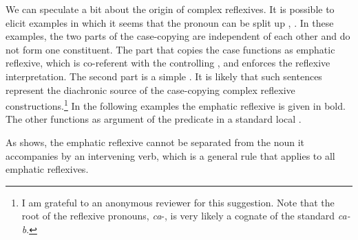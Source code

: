 \begin{exe} 
\end{exe}

We can speculate a bit about the origin of complex reflexives. It is possible to elicit examples in which it seems that the pronoun can be split up , . In these examples, the two parts of the case-copying  are independent of each other and do not form one constituent. The part that copies the case functions as emphatic reflexive, which is co-referent with the controlling , and enforces the reflexive interpretation. The second part is a simple . It is likely that such sentences represent the diachronic source of the case-copying complex reflexive constructions.\footnote{I am grateful to an anonymous reviewer for this suggestion. Note that the root of the  reflexive pronouns, \textit{ca}-, is very likely a cognate of the standard  \textit{ca-b}.} In the following examples  the emphatic reflexive is given in bold. The other  functions as  argument of the predicate  in a standard local .

\begin{exe}
	\ex	\label{ex:Rashid will you please stop staring at the mirror}
	\begin{xlist}
		\ex	{}		\label{ex:Rashid will you please stop staring at the mirror@A}

		\ex	{}		\label{ex:Rashid will you please stop staring at the mirror@B}
	\end{xlist}
\end{exe}

As  shows, the emphatic reflexive cannot be separated from the noun it accompanies by an intervening verb, which is a general rule that applies to all emphatic reflexives.

